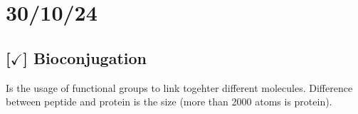\section{30/10/24}

\subsection{[$\checkmark$] Bioconjugation}

Is the usage of functional groups to link togehter different molecules. Difference between peptide and protein is the size (more than 2000 atoms is protein).


